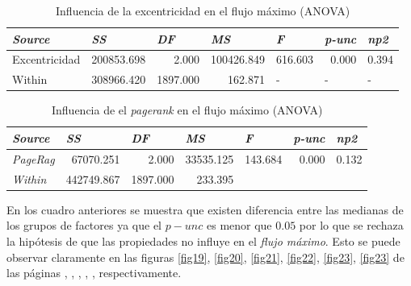 \documentclass{article}
\begin{document}
\begin{table}[htbp]
  \centering
  \caption{Influencia de la excentricidad en el flujo máximo (ANOVA)}
    \begin{tabular}{lrrrlll}
    \toprule
    \textit{\textbf{Source}} & \multicolumn{1}{l}{\textit{\textbf{SS}}} & \multicolumn{1}{l}{\textit{\textbf{DF}}} & \multicolumn{1}{l}{\textit{\textbf{MS}}} & \textit{\textbf{F}} & \textit{\textbf{p-unc}} & \textit{\textbf{np2}} \\
    \midrule
    Excentricidad & 200853.698 & 2.000 & 100426.849 & \multicolumn{1}{r}{616.603} & \multicolumn{1}{r}{0.000} & \multicolumn{1}{r}{0.394} \\
    Within & 308966.420 & 1897.000 & 162.871 & -     & -     & - \\
    \bottomrule
    \end{tabular}%
  \label{tab:t25}%
\end{table}%

\begin{table}[htbp]
  \centering
  \caption{Influencia de el \textit{pagerank} en el flujo máximo (ANOVA)}
    \begin{tabular}{lrrrrrr}
    \toprule
    \textit{\textbf{Source}} & \multicolumn{1}{l}{\textit{\textbf{SS}}} & \multicolumn{1}{l}{\textit{\textbf{DF}}} & \multicolumn{1}{l}{\textit{\textbf{MS}}} & \multicolumn{1}{l}{\textit{\textbf{F}}} & \multicolumn{1}{l}{\textit{\textbf{p-unc}}} & \multicolumn{1}{l}{\textit{\textbf{np2}}} \\
    \midrule
    \textit{PageRag} & 67070.251 & 2.000 & 33535.125 & 143.684 & 0.000 & 0.132 \\
    \textit{Within} & 442749.867 & 1897.000 & 233.395 &       &       &  \\
    \bottomrule
    \end{tabular}%
  \label{tab:t26}%
\end{table}%

En los cuadro anteriores se muestra que existen diferencia entre las medianas de los grupos de factores ya que el \textbf{$p-unc$} es menor que $0.05$ por lo que se rechaza la hipótesis de que las propiedades no influye en el \textit{flujo máximo}. Esto se puede observar claramente en las figuras \ref{fig19}, \ref{fig20}, \ref{fig21}, \ref{fig22}, \ref{fig23}, \ref{fig23} de las páginas \pageref{fig19}, \pageref{fig20}, \pageref{fig21}, \pageref{fig22}, \pageref{fig23}, \pageref{fig24} respectivamente.
\end{document}

